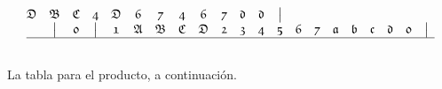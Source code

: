 \documentclass[final,12pt,a4paper,twoside,fleqn]{extbook}
\theoremstyle{definition}
\theoremstyle{remark}
\begin{document}
\begin{equation}
\begin{array}{@{}*{22}c@{}}
      {\mathfrak{D}} &%
      {\mathfrak{B}}       &%
      {\mathfrak{C}}        &%
      {\mathfrak{4}} &%
      {\mathfrak{D}}       &%
      {\mathfrak{6}}     &%
      {\mathfrak{7}}        &%
      {\mathfrak{4}} &%
      {\mathfrak{6}} &%
      {\mathfrak{7}} &%
      {\mathfrak{d}} &%
      {\mathfrak{d}} &%
      \big\vert         %
      \\ \nonumber
      {}             &%
      \big\vert        &%
      {\mathfrak{0}} &%
      \big\vert        &%
      {\mathfrak{1}} &%
      {\mathfrak{A}} &%
      {\mathfrak{B}} &%
      {\mathfrak{C}} &%
      {\mathfrak{D}} &%
      {\mathfrak{2}}       &%
      {\mathfrak{3}}        &%
      {\mathfrak{4}} &%
      {\mathfrak{5}}       &%
      {\mathfrak{6}}     &%
      {\mathfrak{7}}        &%
      {\mathfrak{a}} &%
      {\mathfrak{b}} &%
      {\mathfrak{c}} &%
      {\mathfrak{d}} &%
      {\mathfrak{0}} &%
      \big\vert         %
      \\ \hline \nonumber
    \end{array}
\end{equation}



	La tabla para el producto, a continuación.
\end{document}
